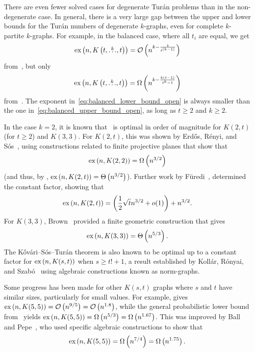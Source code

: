 There are even fewer solved cases for degenerate Turán problems than in the non-degenerate case.
In general, there is a very large gap between the upper and lower bounds for the Turán numbers of degenerate $k$-graphs,
even for complete $k$-partite $k$-graphs.
For example, in the balanced case, where all $t_i$ are equal, we get
\begin{equation} \label{eq:balanced_upper_bound_open}
    \text{ex} \left( n, K\left(t, \overset{k}{\dots}, t\right) \right) = \mathcal{O}\left(n^{k - \frac{1}{t^{(k-1)}}}\right)
\end{equation}
from~, but only
\begin{equation} \label{eq:balanced_lower_bound_open}
    \text{ex} \left( n, K\left(t, \overset{k}{\dots}, t\right) \right) = \Omega\left(n^{k - \frac{k(t-1)}{t^k - 1}}\right)
\end{equation}
from~.
The exponent in~\eqref{eq:balanced_lower_bound_open} is always
smaller than the one in~\eqref{eq:balanced_upper_bound_open},
as long as ${t \geq 2}$ and ${k \geq 2}$.

In the case $k=2$, it is known that~ is optimal in order of magnitude for
$K(2, t)$ (for $t \geq 2$) and $K(3, 3)$.
For $K(2, t)$, this was shown by Erdős, Rényi, and Sós~\cite{erdHos1966problem},
using constructions related to finite projective planes that show that
\[
    \text{ex} \left( n, K(2, 2) \right) = \Omega\left(n^{3/2}\right)
\]
(and thus, by , $\text{ex} \left( n, K(2, t) \right) = \Theta\left(n^{3/2}\right)$).
Further work by Füredi~\cite{furedi1996new},
determined the constant factor, showing that
\[
    \text{ex} \left( n, K(2, t) \right) = \left( \frac{1}{2} \sqrt{t} n^{3/2} + o(1) \right)+ n^{3/2}.
\]
For $K(3,3)$, Brown~\cite{brown1966graphs} provided a finite geometric construction that gives
\[
    \text{ex} \left( n, K(3, 3) \right) = \Theta\left(n^{5/3}\right).
\]
The Kővári–Sós–Turán theorem is also known to be optimal up to a constant factor for $\text{ex} \left( n, K(s,t) \right)$ when $s \ge t!+1$, a result established
by Kollár, Rónyai, and Szabó~\cite{kollar1996norm} using algebraic constructions known as norm-graphs.

Some progress has been made for other $K(s, t)$ graphs where $s$ and $t$ have similar sizes, particularly for small values.
For example,  gives
$\text{ex} \left( n, K(5,5) \right) = \mathcal{O}\left(n^{9/5}\right) = \mathcal{O}\left(n^{1.8}\right)$,
while the general probabilistic lower bound from~ yields
$\text{ex} \left( n, K(5,5) \right) = \Omega\left(n^{5/3}\right) = \Omega\left(n^{1.67}\right)$.
This was improved by Ball and Pepe~\cite{ball2012asymptotic}, who used specific algebraic constructions
to show that
\[
    \text{ex} \left( n, K(5,5) \right) = \Omega\left(n^{7/4}\right) = \Omega\left(n^{1.75}\right).
\]

